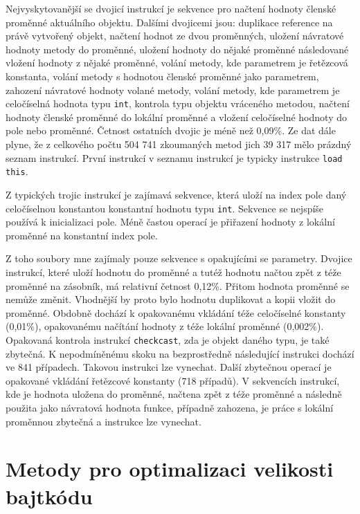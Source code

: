 
Nejvyskytovanější se dvojicí instrukcí je sekvence pro načtení hodnoty členské proměnné aktuálního objektu. Dalšími dvojicemi jsou: duplikace reference na právě vytvořený objekt, načtení hodnot ze dvou proměnných, uložení návratové hodnoty metody do proměnné, uložení hodnoty do nějaké proměnné následované vložení hodnoty z nějaké proměnné, volání metody, kde parametrem je řetězcová konstanta, volání metody s hodnotou členské proměnné jako parametrem, zahození návratové hodnoty volané metody, volání metody, kde parametrem je celočíselná hodnota typu \texttt{int}, kontrola typu objektu vráceného metodou, načtení hodnoty členské proměnné do lokální proměnné a vložení celočíselné hodnoty do pole nebo proměnné. Četnost ostatních dvojic je méně než 0,09\%. Ze dat dále plyne, že z celkového počtu 504 741 zkoumaných metod jich 39 317 mělo prázdný seznam instrukcí. První instrukcí v seznamu instrukcí je typicky instrukce \texttt{load this}. 


Z typických trojic instrukcí je zajímavá sekvence, která uloží na index pole daný celočíselnou konstantou konstantní hodnotu typu \texttt{int}. Sekvence se nejspíše používá k inicializaci pole. Méně častou operací je přiřazení hodnoty z lokální proměnné na konstantní index pole. 

Z toho soubory mne zajímaly pouze sekvence s opakujícími se parametry. Dvojice instrukcí, které uloží hodnotu do proměnné a tutéž hodnotu načtou zpět z téže proměnné na zásobník, má relativní četnost 0,12\%. Přitom hodnota proměnné se nemůže změnit. Vhodnější by proto bylo hodnotu duplikovat a kopii vložit do proměnné. Obdobně dochází k opakovanému vkládání téže celočíselné konstanty (0,01\%), opakovanému načítání hodnoty z téže lokální proměnné (0,002\%). Opakovaná kontrola instrukcí \texttt{checkcast}, zda je objekt daného typu, je také zbytečná. K nepodmíněnému skoku na bezprostředně následující instrukci dochází ve 841 případech. Takovou instrukci lze vynechat. Další zbytečnou operací je opakované vkládání řetězcové konstanty (718 případů). V sekvencích instrukcí, kde je hodnota uložena do proměnné, načtena zpět z téže proměnné a následně použita jako návratová hodnota funkce, případně zahozena, je práce s lokální proměnnou zbytečná a instrukce lze vynechat.









\section{Metody pro optimalizaci velikosti bajtkódu}\label{Analysis}



